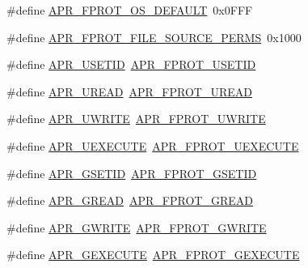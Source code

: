 \begin{DoxyCompactItemize}
\#define \hyperlink{group__apr__file__permissions_gad3c65a67ee6eb12ecc6a33857397900b}{A\+P\+R\+\_\+\+F\+P\+R\+O\+T\+\_\+\+O\+S\+\_\+\+D\+E\+F\+A\+U\+LT}~0x0\+F\+FF
\item 
\#define \hyperlink{group__apr__file__permissions_gac08d4e868c7c9532f7c97c70556663dc}{A\+P\+R\+\_\+\+F\+P\+R\+O\+T\+\_\+\+F\+I\+L\+E\+\_\+\+S\+O\+U\+R\+C\+E\+\_\+\+P\+E\+R\+MS}~0x1000
\item 
\#define \hyperlink{group__apr__file__permissions_gafae6b531c08999345536cae5654d0d03}{A\+P\+R\+\_\+\+U\+S\+E\+T\+ID}~\hyperlink{group__apr__file__permissions_ga67caebf5bbe4f3f4b6252a75e5ce066f}{A\+P\+R\+\_\+\+F\+P\+R\+O\+T\+\_\+\+U\+S\+E\+T\+ID}
\item 
\#define \hyperlink{group__apr__file__permissions_ga51dc87ecd94c98e97694e68d5d9620a0}{A\+P\+R\+\_\+\+U\+R\+E\+AD}~\hyperlink{group__apr__file__permissions_gaab6c4c2e7b95f4345c248c27b3f1a655}{A\+P\+R\+\_\+\+F\+P\+R\+O\+T\+\_\+\+U\+R\+E\+AD}
\item 
\#define \hyperlink{group__apr__file__permissions_ga4faa7fdfa3bcda569dd1e23ae002c5e5}{A\+P\+R\+\_\+\+U\+W\+R\+I\+TE}~\hyperlink{group__apr__file__permissions_ga50b985779b15fbfdae0758e98ffb92af}{A\+P\+R\+\_\+\+F\+P\+R\+O\+T\+\_\+\+U\+W\+R\+I\+TE}
\item 
\#define \hyperlink{group__apr__file__permissions_ga4c08d7e798ab4022e31ed70f06f202b5}{A\+P\+R\+\_\+\+U\+E\+X\+E\+C\+U\+TE}~\hyperlink{group__apr__file__permissions_ga156e1374a4ef30e745340d8c20b36d03}{A\+P\+R\+\_\+\+F\+P\+R\+O\+T\+\_\+\+U\+E\+X\+E\+C\+U\+TE}
\item 
\#define \hyperlink{group__apr__file__permissions_ga4e4e9bb05f2bb156b174461551c9c329}{A\+P\+R\+\_\+\+G\+S\+E\+T\+ID}~\hyperlink{group__apr__file__permissions_ga5fcf6746afdd4e9b8be6ceab6892a3f5}{A\+P\+R\+\_\+\+F\+P\+R\+O\+T\+\_\+\+G\+S\+E\+T\+ID}
\item 
\#define \hyperlink{group__apr__file__permissions_ga1bd0305f31cb3bb20a8f9db898b96eb1}{A\+P\+R\+\_\+\+G\+R\+E\+AD}~\hyperlink{group__apr__file__permissions_ga5ad9b67b8008db3ffc56c3c2a65aa192}{A\+P\+R\+\_\+\+F\+P\+R\+O\+T\+\_\+\+G\+R\+E\+AD}
\item 
\#define \hyperlink{group__apr__file__permissions_ga794c425b459aa46939f6febabbe9daef}{A\+P\+R\+\_\+\+G\+W\+R\+I\+TE}~\hyperlink{group__apr__file__permissions_gacecdc9f88b04c768150418688b786500}{A\+P\+R\+\_\+\+F\+P\+R\+O\+T\+\_\+\+G\+W\+R\+I\+TE}
\item 
\#define \hyperlink{group__apr__file__permissions_ga79ce615a96a407d6c53325a2f8cdee3d}{A\+P\+R\+\_\+\+G\+E\+X\+E\+C\+U\+TE}~\hyperlink{group__apr__file__permissions_gab627bef3f9ceb84bbf00906eaeb12184}{A\+P\+R\+\_\+\+F\+P\+R\+O\+T\+\_\+\+G\+E\+X\+E\+C\+U\+TE}

\end{DoxyCompactItemize}
